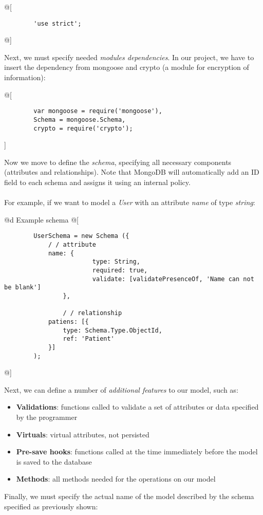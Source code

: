 	@[
		\begin{lstlisting}
		'use strict';
		\end{lstlisting}
	@]

Next, we must specify needed \emph{modules dependencies}. In our project, we have to insert the dependency from mongoose and crypto (a module for encryption of information):

	@[
		\begin{lstlisting}      
		var mongoose = require('mongoose'),
		Schema = mongoose.Schema,
		crypto = require('crypto');
		\end{lstlisting}
	]

Now we move to define the \emph{schema}, specifying all necessary components (attributes and relationships). Note that MongoDB will automatically add an ID field to each schema and assigns it using an internal policy.
\\
\\For example, if we want to model a \emph{User} with an attribute \emph{name} of type \emph{string}:

\newpage

	@d {Example schema} @[
		\begin{lstlisting} 
		UserSchema = new Schema ({
		  	/ / attribute
		  	name: {
		         		type: String,
		         		required: true,
		         		validate: [validatePresenceOf, 'Name can not be blank']
		     	},

		    	/ / relationship
		   	patiens: [{
		   		type: Schema.Type.ObjectId,
		   		ref: 'Patient'
		   	}]
		); 
		\end{lstlisting}
	@]

Next, we can define a number of \emph{additional features} to our model, such as:

\begin{itemize}
	\item \textbf{Validations}: functions called to validate a set of attributes or data specified by the programmer
	\item \textbf{Virtuals}: virtual attributes, not persisted
	\item \textbf{Pre-save hooks}: functions called at the time immediately before the model is saved to the database
	\item \textbf{Methods}: all methods needed for the operations on our model 
\end{itemize}

Finally, we must specify the actual name of the model described by the schema specified as previously shown:


